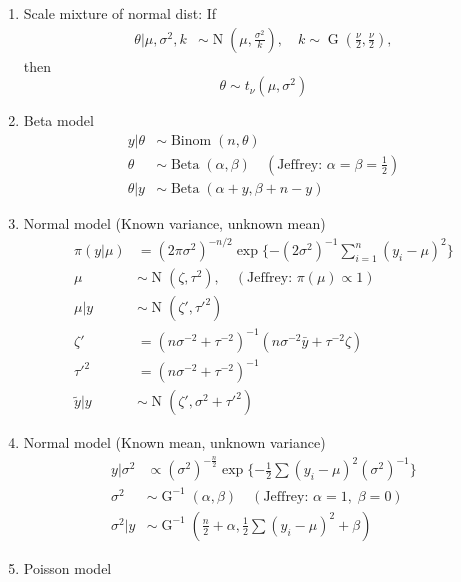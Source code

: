 \documentclass[10pt,landscape]{article}
\newcommand{\Beta}{\operatorname{Beta}}
\newcommand{\Binom}{\operatorname{Binom}}
\newcommand{\N}{\operatorname{N}}
\newcommand{\G}{\operatorname{G}}
\begin{document}
\begin{multicols}{3}
\begin{enumerate}
\item Scale mixture of normal dist:
  If
  \begin{align*}
    \theta | \mu, \sigma^2, k & \sim \N(\mu, \frac{\sigma^2}{k}), \quad k \sim \G(\frac{\nu}{2}, \frac{\nu}{2}),
  \end{align*}
  then
  \[
    \theta \sim t_\nu(\mu, \sigma^2)
  \]
\item Beta model
  \begin{align*}
    y | \theta & \sim \Binom(n, \theta) \\
    \theta & \sim \Beta(\alpha, \beta) \quad(\text{Jeffrey: } \alpha = \beta = \frac{1}{2})\\
    \theta | y & \sim \Beta(\alpha + y, \beta + n - y)
  \end{align*}
\item Normal model (Known variance, unknown mean)
  \begin{align*}
          \pi(y | \mu) & = (2\pi\sigma^2)^{-n/2} \exp\{-(2\sigma^2)^{-1}\sum_{i=1}^n(y_i - \mu)^2\} \\
    \mu & \sim \N(\zeta, \tau^2), \quad(\text{Jeffrey: } \pi(\mu) \propto 1) \\
    \mu | y & \sim \N(\zeta', \tau'^2) \\
      \zeta' & = (n\sigma^{-2} + \tau^{-2})^{-1}(n\sigma^{-2}\bar{y} + \tau^{-2}\zeta) \\
      \tau'^2 & = (n\sigma^{-2} + \tau^{-2})^{-1} \\
      \tilde{y} | y & \sim \N(\zeta', \sigma^2 + \tau'^2)
  \end{align*}
\item Normal model (Known mean, unknown variance)
  \begin{align*}
    y | \sigma^2 & \propto (\sigma^2)^{-\frac{n}{2}}\exp\{-\frac{1}{2}\sum(y_i-\mu)^2 (\sigma^2)^{-1}\}\\
    \sigma^2 & \sim \G^{-1}(\alpha, \beta) \quad(\text{Jeffrey: } \alpha=1,\; \beta=0)\\
    \sigma^2 | y & \sim \G^{-1}(\frac{n}{2} + \alpha, \frac{1}{2}\sum(y_i - \mu)^2 + \beta)
  \end{align*}
\item Poisson model

\end{enumerate}
\end{multicols}
\end{document}
